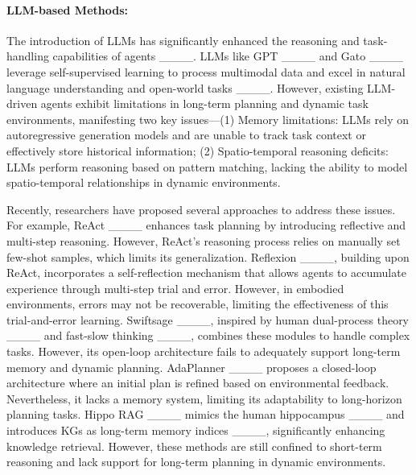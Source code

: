 \paragraph{LLM-based Methods:} The introduction of LLMs has significantly enhanced the reasoning and task-handling capabilities of agents ____. LLMs like GPT ____ and Gato ____ leverage self-supervised learning to process multimodal data and excel in natural language understanding and open-world tasks ____. However, existing LLM-driven agents exhibit limitations in long-term planning and dynamic task environments, manifesting two key issues---(1) Memory limitations: LLMs rely on autoregressive generation models and are unable to track task context or effectively store historical information; (2) Spatio-temporal reasoning deficits: LLMs perform reasoning based on pattern matching, lacking the ability to model spatio-temporal relationships in dynamic environments.

Recently, researchers have proposed several approaches to address these issues. 
For example, ReAct ____ enhances task planning by introducing reflective and multi-step reasoning. However, ReAct's reasoning process relies on manually set few-shot samples, which limits its generalization. Reflexion ____, building upon ReAct, incorporates a self-reflection mechanism that allows agents to accumulate experience through multi-step trial and error. However, in embodied environments, errors may not be recoverable, limiting the effectiveness of this trial-and-error learning. Swiftsage ____, inspired by human dual-process theory ____ and fast-slow thinking ____, combines these modules to handle complex tasks. However, its open-loop architecture fails to adequately support long-term memory and dynamic planning. AdaPlanner ____ proposes a closed-loop architecture where an initial plan is refined based on environmental feedback. Nevertheless, it lacks a memory system, limiting its adaptability to long-horizon planning tasks. Hippo RAG ____ mimics the human hippocampus ____ and introduces KGs as long-term memory indices ____, significantly enhancing knowledge retrieval. However, these methods are still confined to short-term reasoning and lack support for long-term planning in dynamic environments.